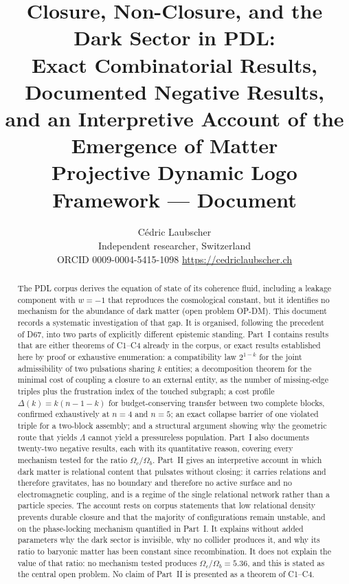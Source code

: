\documentclass[11pt,a4paper]{article}
\title{Closure, Non-Closure, and the Dark Sector in PDL:\\ Exact Combinatorial Results, Documented Negative Results,\\ and an Interpretive Account of the Emergence of Matter\\[0.5em] \large Projective Dynamic Logo Framework --- Document \docid}
\author{C\'edric Laubscher\\ \small Independent researcher, Switzerland\\ \small ORCID 0009-0004-5415-1098 \quad \url{https://cedriclaubscher.ch}}
\date{}
\theoremstyle{plain}
\theoremstyle{definition}
\theoremstyle{remark}
\begin{document}
\maketitle

\begin{abstract}
The PDL corpus derives the equation of state of its coherence fluid, including a leakage component with $w=-1$ that reproduces the cosmological constant, but it identifies no mechanism for the abundance of dark matter (open problem OP-DM). This document records a systematic investigation of that gap. It is organised, following the precedent of D67, into two parts of explicitly different epistemic standing. Part~I contains results that are either theorems of C1--C4 already in the corpus, or exact results established here by proof or exhaustive enumeration: a compatibility law $2^{1-k}$ for the joint admissibility of two pulsations sharing $k$ entities; a decomposition theorem for the minimal cost of coupling a closure to an external entity, as the number of missing-edge triples plus the frustration index of the touched subgraph; a cost profile $\Delta(k)=k(n-1-k)$ for budget-conserving transfer between two complete blocks, confirmed exhaustively at $n=4$ and $n=5$; an exact collapse barrier of one violated triple for a two-block assembly; and a structural argument showing why the geometric route that yields $\Lambda$ cannot yield a pressureless population. Part~I also documents twenty-two negative results, each with its quantitative reason, covering every mechanism tested for the ratio $\Omega_c/\Omega_b$. Part~II gives an interpretive account in which dark matter is relational content that pulsates without closing: it carries relations and therefore gravitates, has no boundary and therefore no active surface and no electromagnetic coupling, and is a regime of the single relational network rather than a particle species. The account rests on corpus statements that low relational density prevents durable closure and that the majority of configurations remain unstable, and on the phase-locking mechanism quantified in Part~I. It explains without added parameters why the dark sector is invisible, why no collider produces it, and why its ratio to baryonic matter has been constant since recombination. It does not explain the value of that ratio: no mechanism tested produces $\Omega_c/\Omega_b=5.36$, and this is stated as the central open problem. No claim of Part~II is presented as a theorem of C1--C4.
\end{abstract}
\end{document}
